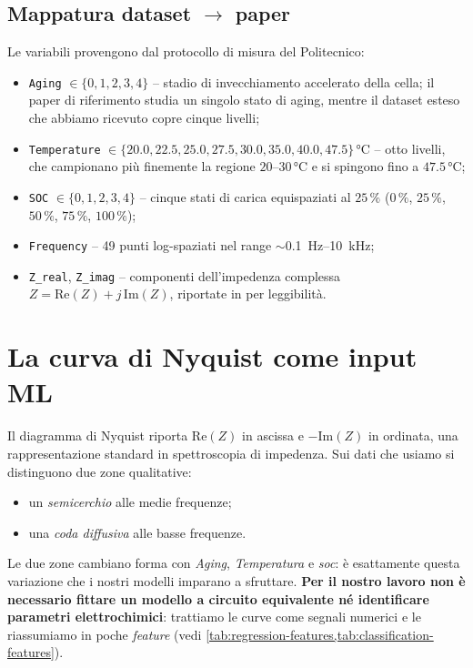 \subsection{Mappatura dataset \texorpdfstring{$\to$}{->} paper}

Le variabili provengono dal protocollo
di misura del Politecnico:

\begin{itemize}
  \item \texttt{Aging} $\in \{0,1,2,3,4\}$ -- stadio di invecchiamento
        accelerato della cella; il paper di riferimento studia un
        singolo stato di aging, mentre il dataset esteso che abbiamo
        ricevuto copre cinque livelli;
  \item \texttt{Temperature} $\in \{20.0, 22.5, 25.0, 27.5, 30.0, 35.0,
        40.0, 47.5\}$\,\si{\celsius} -- otto livelli, che campionano
        più finemente la regione $20$--$30$\,°C e si spingono fino a
        $47.5$\,°C;
  \item \texttt{SOC} $\in \{0,1,2,3,4\}$ -- cinque stati di carica
        equispaziati al $25\,\%$ ($0\,\%$, $25\,\%$, $50\,\%$, $75\,\%$,
        $100\,\%$);
  \item \texttt{Frequency} -- 49 punti log-spaziati nel range
        $\sim$\SI{0.1}{\hertz}--\SI{10}{\kilo\hertz};
  \item \texttt{Z\_real}, \texttt{Z\_imag} -- componenti dell'impedenza
        complessa $Z = \mathrm{Re}(Z) + j\,\mathrm{Im}(Z)$, riportate in
        \milliohm{} per leggibilità.
\end{itemize}

\section{La curva di Nyquist come input ML}

Il diagramma di Nyquist riporta $\mathrm{Re}(Z)$ in ascissa e
$-\mathrm{Im}(Z)$ in ordinata, una rappresentazione standard in
spettroscopia di impedenza. Sui dati che usiamo si distinguono due
zone qualitative:
\begin{itemize}
  \item un \emph{semicerchio} alle medie frequenze;
  \item una \emph{coda diffusiva} alle basse frequenze.
\end{itemize}

Le due zone cambiano forma con \emph{Aging}, \emph{Temperatura} e
\emph{\acrshort{soc}}: è esattamente questa variazione che i nostri
modelli imparano a sfruttare. \textbf{Per il nostro lavoro non è
necessario fittare un modello a circuito equivalente né identificare
parametri elettrochimici}: trattiamo le curve come segnali numerici e
le riassumiamo in poche \emph{feature} (vedi
\cref{tab:regression-features,tab:classification-features}).

